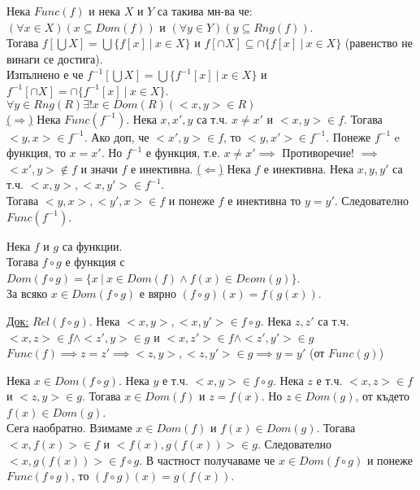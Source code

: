 \documentclass[fleqn, titlepage, 12pt]{report}
\begin{document}
 Нека $Func(f)$ и нека $X$ и $Y$ са такива мн-ва че:\\
$(\forall{x \in X})(x \subseteq Dom(f))$ и $(\forall{y \in Y})(y \subseteq Rng(f))$.\\
Тогава $f[\bigcup X ] = \bigcup \{f[x]\ |\ x \in X\}$
и $f[\cap X ] \subseteq \cap \{f[x]\ |\ x \in X\}$ (равенство не винаги се достига).\\
Изпълнено е че $f ^{-1}[\bigcup X] = \bigcup \{f ^{-1} [x]\ |\ x \in X\}$
и $f ^{-1}[\cap X] = \cap \{f ^{-1} [x]\ |\ x \in X\}$.\\
$\forall{y \in Rng(R)\exists{!x \in Dom(R)(<x,y> \in R)}}$\\

\underline{($\Rightarrow$)} Нека $Func(f ^{-1})$. Нека $x, x',y$ са т.ч. $x \neq x'$ и $<x,y> \in f$.
Тогава $<y,x> \in f ^{-1}$. Ако доп, че $<x',y> \in f$, то $<y,x'> \in f ^{-1}$. Понеже $f ^{-1}$ e функция, то $x = x'$.
Но $f ^{-1}$ е функция, т.е. $x \neq x' \implies$ Противоречие! $\implies$ $<x',y> \notin f$ и значи $f$ е инективна.
\bigbreak
\underline{($\Leftarrow$)} Нека $f$ е инективна. Нека $x,y,y'$ са т.ч. $<x,y>, <x,y'> \in f ^{-1}$.\\
Тогава $<y,x>, <y',x> \in f$ и понеже $f$ е инективна то $y = y'$. Следователно $Func(f ^{-1})$.
\bigbreak

 Нека $f$ и $g$ са функции.\\
Тогава $f \circ g$ е функция с $Dom(f \circ g) = \{x\ |\ x \in Dom(f) \land f(x) \in Deom(g)\}$.\\
За всяко $x \in Dom(f \circ g)$ е вярно $ (f \circ g)(x) = f(g(x))$.
\bigbreak

\underline{Док:} $Rel(f \circ g)$. Нека $<x,y>, <x,y'> \in f \circ g$.
Нека $z,z'$ са т.ч. $<x,z> \in f \land <z',y> \in g$ и $<x,z'> \in f \land <z',y'> \in g$\\
$Func(f) \implies z = z' \implies <z,y>, <z,y'> \in g \implies y = y'$ (от $Func(g)$)
\bigbreak

Нека $x \in Dom(f \circ g)$. Нека $y$ е т.ч. $<x,y> \in f \circ g$. Нека $z$ е т.ч. $<x,z> \in f$ и $<z,y> \in g$.
Тогава $x \in Dom(f)$ и $z = f(x)$. Но $z \in Dom(g)$, от където $f(x) \in Dom(g)$.\\
Сега наобратно. Взимаме $x \in Dom(f)$ и $f(x) \in Dom(g)$. Тогава $<x,f(x)> \in f$ и $<f(x), g(f(x))> \in g$.
Следователно $<x,g(f(x))> \in f \circ g$. В частност получаваме че $x \in Dom(f \circ g)$ и понеже $Func(f \circ g)$,
то $(f \circ g)(x) = g(f(x))$.
\bigbreak
\end{document}

